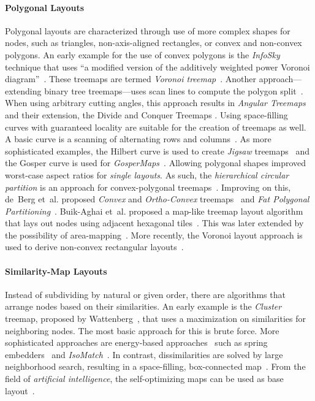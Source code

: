 \documentclass[sigconf%
,natbib=true%
]{acmart}
\begin{document}
\paragraph{\textbf{Polygonal Layouts}}
Polygonal layouts are characterized through use of more complex shapes for nodes, such as triangles, non-axis-aligned rectangles, or convex and non-convex polygons.
An early example for the use of convex polygons is the \emph{InfoSky} technique that uses \enquote{a modified version of the additively weighted power Voronoi diagram}~\cite{andrews2002-infosky}.
These treemaps are termed \emph{Voronoi treemap}~\cite{balzer2005-voronoi}.
Another approach---extending binary tree treemaps---uses scan lines to compute the polygon split~\cite{balzer2005-treemapenhanced}.
When using arbitrary cutting angles, this approach results in \emph{Angular Treemaps}~\cite{liang2012-angulartreemaps} and their extension, the Divide and Conquer Treemaps \cite{liang2013-divideandconquer}.
Using space-filling curves with guaranteed locality are suitable for the creation of treemaps as well.
A basic curve is a scanning of alternating rows and columns~\cite{schreck2006-regular}.
As more sophisticated examples, the Hilbert curve is used to create \emph{Jigsaw} treemaps~\cite{wattenberg2005-spacefillingcurves} and the Gosper curve is used for \emph{GosperMaps}~\cite{auber2013-gospermap}.
Allowing polygonal shapes improved worst-case aspect ratios for \emph{single layouts}.
As such, the \emph{hierarchical circular partition} is an approach for convex-polygonal treemaps~\cite{onak2008-circularpartitions}.
Improving on this, de~Berg et~al. proposed \emph{Convex} and \emph{Ortho-Convex} treemaps~\cite{deBerg2011-bounded} and \emph{Fat Polygonal Partitioning}~\cite{deBerg2013-polygonal}.
Buik-Aghai et~al. proposed a map-like treemap layout algorithm that lays out nodes using adjacent hexagonal tiles~\cite{biukaghai2014-wikipedia}.
This was later extended by the possibility of area-mapping~\cite{yang2015-hexagontiling}.
More recently, the Voronoi layout approach is used to derive non-convex rectangular layouts~\cite{wang2019-orthogonalvoronoi}.
\paragraph{\textbf{Similarity-Map Layouts}}
Instead of subdividing by natural or given order, there are algorithms that arrange nodes based on their similarities.
An early example is the \emph{Cluster} treemap, proposed by Wattenberg~\cite{wattenberg1999-stockmarket}, that uses a maximization on similarities for neighboring nodes.
The most basic approach for this is brute force.
More sophisticated approaches are energy-based approaches~\cite{bohnet2006-visualexploration} such as spring embedders~\cite{biukaghai2014-wikipedia} and \emph{IsoMatch}~\cite{fried2015-isomatch}.
In contrast, dissimilarities are solved by large neighborhood search, resulting in a space-filling, box-connected map~\cite{carrizosa2017-largeneighborhoodsearch}.
From the field of \emph{artificial intelligence}, the self-optimizing maps can be used as base layout~\cite{skupin2002-voronoisomaps}.
\end{document}
